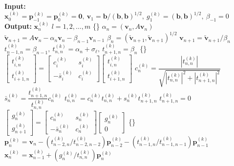 \begin{algorithm}[H]\caption{}\label{alg:shifted-minres}\begin{algorithmic}[1]
\Statex\textbf{Input:} $\bm x_0^{(k)}=\bm p_{-1}^{(k)}=\bm p_0^{(k)}=\bm0,\ \bm v_1=\bm b/(\bm b,\bm b)^{1/2},\ g_1^{(k)}=(\bm b,\bm b)^{1/2},\ \beta_{-1}=0$
\Statex\textbf{Output:} $\bm x_n^{(k)}$  $l=1,2,\ldots,m$
\State \{\}
\State $\alpha_n=(\bm v_n,A\bm v_n)$
\State $\widetilde{\bm v}_{n+1}=A\bm v_n-\alpha_n\bm v_n-\beta_{n-1}\bm v_{n-1}$
\State $\beta_n=(\widetilde{\bm v}_{n+1},\widetilde{\bm v}_{n+1})^{1/2}$
\State $\bm v_{n+1}=\widetilde{\bm v}_{n+1}/\beta_n$
\State $t_{n-1,n}^{(k)}=\beta_{n-1},\ t_{n,n}^{(k)}=\alpha_n+\sigma_{\ell},\ t_{n+1,n}^{(k)}=\beta_n$
\State \{\}
\State $\begin{bmatrix}t_{i,n}^{(k)}\\t_{i+1,n}^{(k)}\end{bmatrix}=\begin{bmatrix}c_i^{(k)}&s_i^{(k)}\\-\bar s_i^{(k)}&c_i^{(k)}\end{bmatrix}\begin{bmatrix}t_{i,n}^{(k)}\\t_{i+1,n}^{(k)}\end{bmatrix}$
\EndFor
\State $c_n^{(k)}=\dfrac{|t_{n,n}^{(k)}|}{\sqrt{|t_{n,n}^{(k)}|^2+|t_{n+1,n}^{(k)}|^2}}$
\State $\bar s_n^{(k)}=\dfrac{t_{n+1,n}^{(k)}}{t_{n,n}^{(k)}}c_n^{(k)}$
\State $t_{n,n}^{(k)}=c_n^{(k)}t_{n,n}^{(k)}+s_n^{(k)}t_{n+1,n}^{(k)}$
\State $t_{n+1,n}^{(k)}=0$
\State $\begin{bmatrix}g_n^{(k)}\\g_{n+1}^{(k)}\end{bmatrix}=\begin{bmatrix}c_n^{(k)}&s_n^{(k)}\\-\bar s_n^{(k)}&c_n^{(k)}\end{bmatrix}\begin{bmatrix}g_n^{(k)}\\0\end{bmatrix}$
\State \{\}
\State $\bm p_n^{(k)}=\bm v_n-(t_{n-2,n}^{(k)}/t_{n-2,n-2}^{(k)})\bm p_{n-2}^{(k)}-(t_{n-1,n}^{(k)}/t_{n-1,n-1}^{(k)})\bm p_{n-1}^{(k)}$
\State $\bm x_n^{(k)}=\bm x_{n-1}^{(k)}+(g_n^{(k)}/t_{n,n}^{(k)})\bm p_n^{(k)}$
\EndIf\EndFor
\State {}
\EndFor\end{algorithmic}\end{algorithm}
